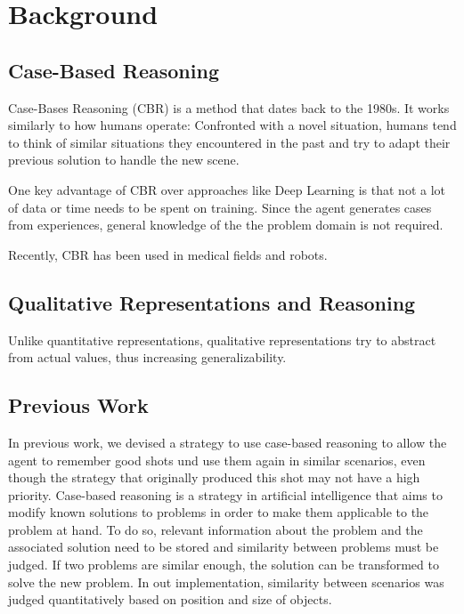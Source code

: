 \section{Background}\label{sec:background}

\subsection{Case-Based Reasoning}
Case-Bases Reasoning (CBR) is a method that dates back to the 1980s. It works similarly to how humans operate: Confronted with a novel situation, humans tend to think of similar situations they encountered in the past and try to adapt their previous solution to handle the new scene. %

One key advantage of CBR over approaches like Deep Learning is that not a lot of data or time needs to be spent on training. Since the agent generates cases from experiences, general knowledge of the the problem domain is not required.\cite{CBR-issues-variations-approaches}

Recently, CBR has been used in medical fields\cite{medical1, mediacl2} and robots\cite{QCBR}. %

\subsection{Qualitative Representations and Reasoning}
Unlike quantitative representations, qualitative representations try to abstract from actual values, thus increasing generalizability.


\subsection{Previous Work}
In previous work, we devised a strategy to use case-based reasoning to allow the agent to remember good shots und use them again in similar scenarios, even though the strategy that originally produced this shot may not have a high priority.
Case-based reasoning is a strategy in artificial intelligence that aims to modify known solutions to problems in order to make them applicable to the problem at hand.
To do so, relevant information about the problem and the associated solution need to be stored and similarity between problems must be judged.
If two problems are similar enough, the solution can be transformed to solve the new problem.
In out implementation, similarity between scenarios was judged quantitatively based on position and size of objects.


